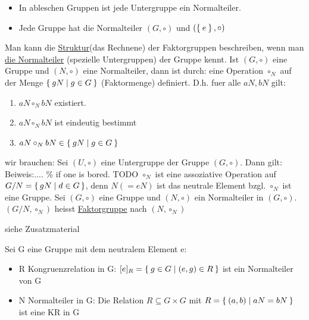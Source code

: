 \documentclass{../tudscript}
\begin{document}
\begin{itemize}
\item In ableschen Gruppen ist jede Untergruppe ein Normalteiler.
\item Jede Gruppe hat die Normalteiler $(G, \circ)$ und $(\Set{e}, \circ)$
\end{itemize}
Man kann die \underline{Struktur}(das Rechnene) der Faktorgruppen beschreiben, wenn man \underline{die Normalteiler} (spezielle Untergruppen) der Gruppe kennt.
Ist $(G, \circ)$ eine Gruppe und $(N, \circ)$ eine Normalteiler, dann ist durch:
eine Operation $\circ_N$ auf der Menge $\Set{gN \mid g \in G}$ (Faktormenge) definiert.
D.h. fuer alle $aN, bN$ gilt:
\begin{enumerate}
\item $aN \circ_N bN$ existiert.
\item $aN \circ_N bN$ ist eindeutig bestimmt
\item $aN \circ_N bN \in \Set{gN \mid g \in G}$ 
\end{enumerate}

wir brauchen:
Sei $(U, \circ)$ eine Untergruppe der Gruppe $(G, \circ)$. Dann gilt:
Beiweis:.... \% if one is bored. TODO
$\circ_N$ ist eine assoziative Operation auf $G/N = \set{gN \mid d \in G}$,
denn
$N(=eN)$ ist das neutrale Element bzgl. $\circ_N$
ist eine Gruppe.
Sei $(G, \circ)$ eine Gruppe und $(N, \circ)$ ein Normalteiler in $(G, \circ)$.
$(G/N, \circ_N)$ heisst \underline{Faktorgruppe} nach $(N, \circ_N)$

siehe Zusatzmaterial

Sei G eine Gruppe mit dem neutralem Element e:
\begin{itemize}
\item R Kongruenzrelation in G: $[e]_R = \Set{g \in G \mid (e,g) \in R}$ ist ein Normalteiler von G
\item N Normalteiler in G: Die Relation $R \subseteq G \times G$ mit $R = \Set{(a,b) \mid aN = bN}$ ist eine KR in G
\end{itemize}
\end{document}
